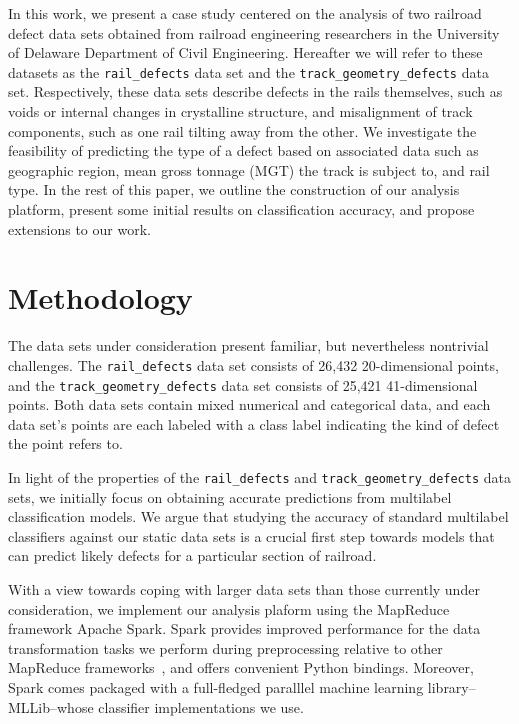 \documentclass{sig-alternate-05-2015}
\begin{document}
In this work, we present a case study centered on the analysis of two railroad defect data sets
obtained from railroad engineering researchers in the University of Delaware Department of 
Civil Engineering. Hereafter we will refer to these datasets as the \texttt{rail\_defects} data 
set and the \texttt{track\_geometry\_defects} data set. Respectively, these data sets describe 
defects in the rails themselves, such as voids or internal changes in crystalline structure, 
and misalignment of track components, such as one rail tilting away from the other. We 
investigate the feasibility of predicting the type of a defect based on associated data such 
as geographic region, mean gross tonnage (MGT) the track is subject to, and rail type. 
In the rest of this paper, we outline the construction of our analysis platform, present some
initial results on classification accuracy, and propose extensions to our work. 

\section{Methodology}
The data sets under consideration present familiar, but nevertheless nontrivial challenges. The 
\texttt{rail\_defects} data set consists of 26,432 20-dimensional points, and the 
\texttt{track\_geometry\_defects} data set consists of 25,421 41-dimensional points. 
Both data sets contain mixed numerical and categorical data, and each data set's points are
each labeled with a class label indicating the kind of defect the point refers to.

In light of the properties of the \texttt{rail\_defects} and 
\texttt{track\_geometry\_defects} data sets, we initially focus on obtaining accurate 
predictions from multilabel classification models. We argue that studying the accuracy of
standard multilabel classifiers against our static data sets is a crucial first step towards
models that can predict likely defects for a particular section of railroad. 

With a view towards coping with larger data sets than those currently under consideration, we
implement our analysis plaform using the MapReduce framework Apache Spark. Spark provides 
improved performance for the data transformation tasks we perform during preprocessing relative
to other MapReduce frameworks~\cite{Zaharia:2012}, and offers convenient Python bindings. Moreover, Spark comes 
packaged with a full-fledged paralllel machine learning library--MLLib--whose classifier 
implementations we use.
\end{document}
